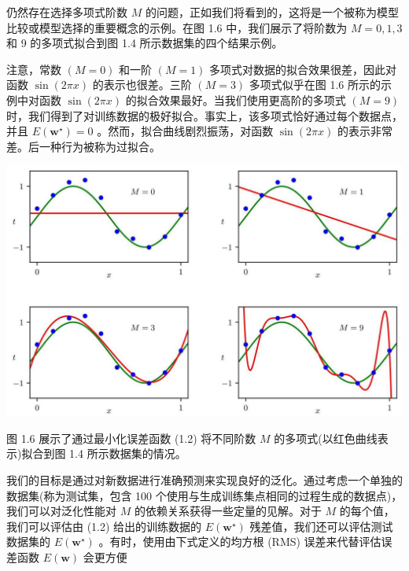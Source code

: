 \documentclass[10pt]{article}
\begin{document}
仍然存在选择多项式阶数 \(M\) 的问题，正如我们将看到的，这将是一个被称为模型比较或模型选择的重要概念的示例。在图 1.6 中，我们展示了将阶数为 \(M = 0,1,3\) 和 9 的多项式拟合到图 1.4 所示数据集的四个结果示例。

注意，常数 \(\left( {M = 0}\right)\) 和一阶 \(\left( {M = 1}\right)\) 多项式对数据的拟合效果很差，因此对函数 \(\sin \left( {2\pi x}\right)\) 的表示也很差。三阶 \(\left( {M = 3}\right)\) 多项式似乎在图 1.6 所示的示例中对函数 \(\sin \left( {2\pi x}\right)\) 的拟合效果最好。当我们使用更高阶的多项式 \(\left( {M = 9}\right)\) 时，我们得到了对训练数据的极好拟合。事实上，该多项式恰好通过每个数据点，并且 \(E\left( {\mathbf{w}}^{ \star  }\right)  = 0\) 。然而，拟合曲线剧烈振荡，对函数 \(\sin \left( {2\pi x}\right)\) 的表示非常差。后一种行为被称为过拟合。

\begin{center}
\includegraphics[max width=1.0\textwidth]{images/0194e279-9b28-703a-88f4-c3ac21e2010d_29_237_340_1321_836_0.jpg}
\end{center}
\hspace*{3em} 

图 1.6 展示了通过最小化误差函数 (1.2) 将不同阶数 \(M\) 的多项式(以红色曲线表示)拟合到图 1.4 所示数据集的情况。

我们的目标是通过对新数据进行准确预测来实现良好的泛化。通过考虑一个单独的数据集(称为测试集，包含 100 个使用与生成训练集点相同的过程生成的数据点)，我们可以对泛化性能对 \(M\) 的依赖关系获得一些定量的见解。对于 \(M\) 的每个值，我们可以评估由 (1.2) 给出的训练数据的 \(E\left( {\mathbf{w}}^{ \star  }\right)\) 残差值，我们还可以评估测试数据集的 \(E\left( {\mathbf{w}}^{ \star  }\right)\) 。有时，使用由下式定义的均方根 (RMS) 误差来代替评估误差函数 \(E\left( \mathbf{w}\right)\) 会更方便
\end{document}
